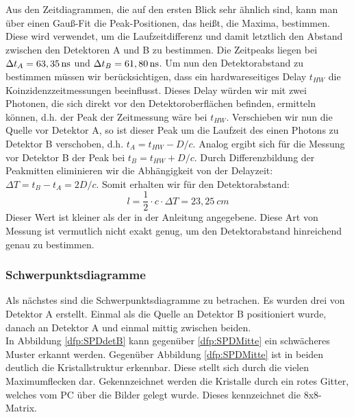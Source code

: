         \label{dft:kaliAB}
    Aus den Zeitdiagrammen, die auf den ersten Blick sehr ähnlich sind, kann man über einen Gauß-Fit die Peak-Positionen, das heißt, die Maxima, bestimmen.
    Diese wird verwendet, um die Laufzeitdifferenz und damit letztlich den Abstand zwischen den Detektoren A und B zu bestimmen.
    Die Zeitpeaks liegen bei $ \Delta t_A = \unit[63,35]{ns}$ und $\Delta t_B = \unit[61,80]{ns}$. Um nun den Detektorabstand zu bestimmen müssen wir berücksichtigen, dass ein hardwareseitiges Delay $t_{HW}$ die Koinzidenzzeitmessungen beeinflusst. Dieses Delay würden wir mit zwei Photonen, die sich direkt vor den Detektoroberflächen befinden, ermitteln können, d.h. der Peak der Zeitmessung wäre bei $t_{HW}$. Verschieben wir nun die Quelle vor Detektor A, so ist dieser Peak um die Laufzeit des einen Photons zu Detektor B verschoben, d.h. $t_A = t_{HW} - D/c$. Analog ergibt sich für die Messung vor Detektor B der Peak bei $t_B=t_{HW} + D/c$. Durch Differenzbildung der Peakmitten eliminieren wir die Abhängigkeit von der Delayzeit: $\Delta T = t_B - t_A = 2D/c $. Somit erhalten wir für den Detektorabstand:
    \begin{equation*}
    	l = \frac{1}{2}\cdot c \cdot \Delta T = 23,25\ \unit{cm}
    \end{equation*}
    Dieser Wert ist kleiner als der in der Anleitung angegebene. Diese Art von Messung ist vermutlich nicht exakt genug, um den Detektorabstand hinreichend genau zu bestimmen.

        
    \subsubsection{Schwerpunktsdiagramme}
    Als nächstes sind die Schwerpunktsdiagramme zu betrachen. Es wurden drei von Detektor A erstellt. Einmal als die Quelle an Detektor B positioniert wurde, danach an Detektor A und einmal mittig zwischen beiden.\\
    In Abbildung \ref{dfp:SPDdetB} kann gegenüber \ref{dfp:SPDMitte} ein schwächeres Muster erkannt werden. Gegenüber Abbildung \ref{dfp:SPDMitte} ist in beiden deutlich die Kristallstruktur erkennbar.
    Diese stellt sich durch die vielen Maximumflecken dar. Gekennzeichnet werden die Kristalle durch ein rotes Gitter, welches vom PC über die Bilder gelegt wurde. Dieses kennzeichnet die 8x8-Matrix.\\
        
